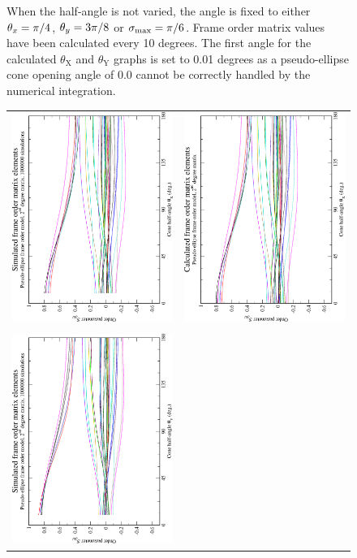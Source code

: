 \begin{figure}
{    When the half-angle is not varied, the angle is fixed to either $\theta_x = \pi/4$, $\theta_y = 3\pi/8$ or $\sigma_\textrm{max} = \pi/6$.
    Frame order matrix values have been calculated every 10 degrees.
    The first angle for the calculated $\theta_\textrm{X}$ and $\theta_\textrm{Y}$ graphs is set to 0.01 degrees as a pseudo-ellipse cone opening angle of 0.0 cannot be correctly handled by the numerical integration.
  }
  \label{fig: simulated and calculated out-of-frame 1st degree pseudo-ellipse frame order}
\end{figure}

\begin{figure}
\centering
  \begin{tabular}{@{}cc@{}}
    \includegraphics[width=.35\textwidth,angle=270]{images/frame_order_matrix/Sijkl_pseudo-ellipse_out_of_frame_theta_x_ens1000000.eps} &
    \includegraphics[width=.35\textwidth,angle=270]{images/frame_order_matrix/Sijkl_pseudo-ellipse_out_of_frame_theta_x_calc.eps} \\
    \\[-5pt]
    \includegraphics[width=.35\textwidth,angle=270]{images/frame_order_matrix/Sijkl_pseudo-ellipse_out_of_frame_theta_y_ens1000000.eps} &

\end{tabular}
\end{figure}
